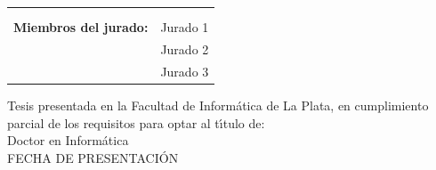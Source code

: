 \begin{titlepage}
\begin{flushright}
\begin{tabular}{rl}
&\\
&\\
\large \textbf{Miembros del jurado:}& Jurado 1\\
                                    & Jurado 2\\
                                    & Jurado 3\\
\end{tabular}
\end{flushright}
\vspace{0.5cm}
\begin{center}
\large Tesis presentada en la Facultad de Informática de La Plata, en cumplimiento
parcial de los requisitos para optar al t{\'\i}tulo de:\\
\vspace{0.5cm} \huge Doctor en Informática\\
\vspace{0.5cm}
\normalsize
FECHA DE PRESENTACI{\'O}N
\end{center}
\end{titlepage}
